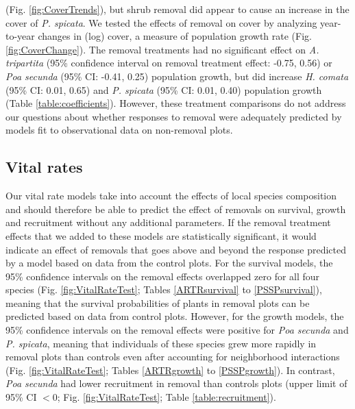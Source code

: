 \documentclass[11pt]{article}
\begin{document}
\begin{doublespacing}
(Fig. \ref{fig:CoverTrends}), but shrub removal did appear to cause an increase in the cover of \textit{P. spicata}. 
We tested the effects of removal on cover by analyzing year-to-year changes in (log) cover, a measure of population growth rate (Fig. \ref{fig:CoverChange}). The removal treatments had no significant effect on 
\textit{A. tripartita} (95\% confidence interval on removal treatment effect: -0.75, 0.56) or 
\textit{Poa secunda} (95\% CI: -0.41, 0.25) population growth, but did increase 
\textit{H. comata} (95\% CI: 0.01, 0.65) and
 \textit{P. spicata} (95\% CI: 0.01, 0.40) population growth 
(Table \ref{table:coefficients}). However, these treatment comparisons do not address our questions about whether responses to removal were 
adequately predicted by models fit to observational data on non-removal plots. 


\subsection*{Vital rates}

Our vital rate models take into account the effects of local species composition and should therefore be able to predict the effect of removals on survival, growth and recruitment without any additional parameters. If the removal treatment effects that we added to these models are statistically significant, it would indicate an effect of removals that goes above and beyond the response predicted by a model based on data from the control plots. For the survival models, the 95\% confidence intervals on the removal effects overlapped zero for all four species (Fig. \ref{fig:VitalRateTest}; Tables \ref{ARTRsurvival} to \ref{PSSPsurvival}), meaning that the survival probabilities of plants in removal plots can be predicted based on data from control plots. However, for the growth models, the 95\% confidence intervals on the removal effects were positive for \textit{Poa secunda}  and \textit{P. spicata}, meaning that individuals of these species grew more rapidly in removal plots than controls even after accounting for neighborhood interactions (Fig. \ref{fig:VitalRateTest}; Tables \ref{ARTRgrowth} to \ref{PSSPgrowth}). In contrast, \textit{Poa secunda} had lower recruitment in removal than controls plots (upper limit of 95\% CI $<0$; Fig. \ref{fig:VitalRateTest}; Table \ref{table:recruitment}).


\end{doublespacing}
\end{document}

